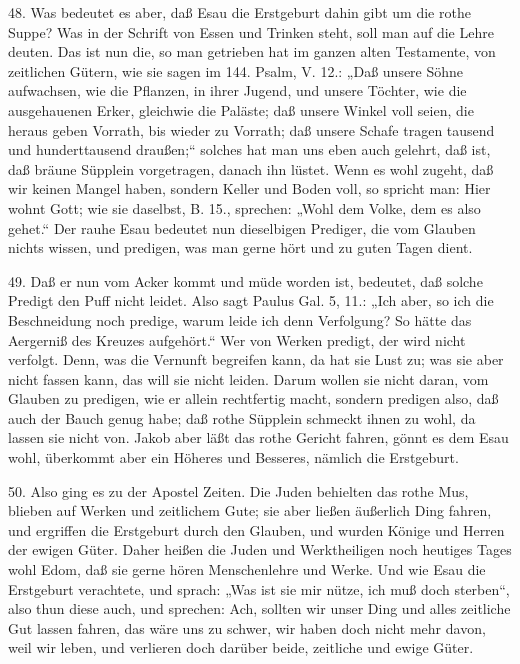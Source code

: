 48. Was bedeutet es aber, daß Esau die Erstgeburt dahin gibt um die rothe Suppe? Was in der Schrift von Essen und Trinken steht, soll man auf die Lehre deuten. Das ist nun die, so man getrieben hat im ganzen alten Testamente, von zeitlichen Gütern, wie sie sagen im 144. Psalm, V. 12.: „Daß unsere Söhne aufwachsen, wie die Pflanzen, in ihrer Jugend, und
unsere Töchter, wie die ausgehauenen Erker, gleichwie die Paläste; daß unsere Winkel voll seien, die heraus geben Vorrath, bis wieder zu Vorrath; daß unsere Schafe tragen tausend und hunderttausend draußen;“ solches hat man uns eben auch gelehrt, daß ist, daß bräune Süpplein vorgetragen, danach ihn lüstet. Wenn es wohl zugeht, daß wir keinen Mangel haben, sondern Keller und Boden voll, so spricht man: Hier wohnt Gott; wie sie daselbst, B. 15., sprechen: „Wohl dem Volke, dem es also gehet.“ Der rauhe Esau bedeutet nun dieselbigen Prediger, die vom Glauben nichts wissen, und predigen, was man gerne hört und zu guten Tagen dient.

49. Daß er nun vom Acker kommt und müde worden ist, bedeutet, daß solche Predigt den Puff nicht leidet. Also sagt Paulus Gal. 5, 11.: „Ich aber, so ich die Beschneidung noch predige, warum leide ich denn Verfolgung? So hätte das Aergerniß des Kreuzes aufgehört.“ Wer von Werken predigt, der wird nicht verfolgt. Denn, was die Vernunft begreifen kann, da hat sie Lust zu; was sie aber nicht fassen kann, das will sie nicht leiden. Darum wollen sie nicht daran, vom Glauben zu predigen, wie er allein rechtfertig macht, sondern predigen also, daß auch der Bauch genug habe; daß rothe Süpplein schmeckt ihnen zu wohl, da lassen sie nicht von. Jakob aber läßt das rothe Gericht fahren, gönnt es dem Esau wohl, überkommt aber ein Höheres und Besseres, nämlich die Erstgeburt.

50. Also ging es zu der Apostel Zeiten. Die Juden behielten das rothe Mus, blieben auf Werken und zeitlichem Gute; sie aber ließen äußerlich Ding fahren, und ergriffen die Erstgeburt durch den Glauben, und wurden Könige und Herren der ewigen Güter. Daher heißen die Juden und Werktheiligen noch heutiges Tages wohl Edom, daß sie gerne hören Menschenlehre und Werke. Und wie Esau die Erstgeburt verachtete, und sprach: „Was ist sie mir nütze, ich muß doch sterben“, also thun diese auch, und sprechen: Ach, sollten wir unser Ding und alles zeitliche Gut lassen fahren, das wäre uns zu schwer, wir haben doch nicht mehr davon, weil wir leben, und verlieren doch darüber beide, zeitliche und ewige Güter.

